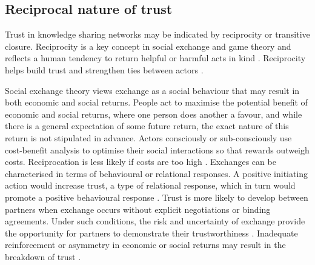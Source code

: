 \subsection{Reciprocal nature of trust}

Trust in knowledge sharing networks may be indicated by reciprocity or transitive closure. Reciprocity is a key concept in social exchange and game theory and reflects a human tendency to return helpful or harmful acts in kind \citep{nowak2005evolution}. Reciprocity helps build trust and strengthen ties between actors \citep{blau1964exchange,axelrod1984evolution}. \medskip 

Social exchange theory views exchange as a social behaviour that may result in both economic and social returns. People act to maximise the potential benefit of economic and social returns, where one person does another a favour, and while there is a general expectation of some future return, the exact nature of this return is not stipulated in advance. Actors consciously or sub-consciously use cost-benefit analysis to optimise their social interactions so that rewards outweigh costs. Reciprocation is less likely if costs are too high \citep{homans1961social,blau1964exchange}. Exchanges can be characterised in terms of behavioural or relational responses. A positive initiating action would increase trust, a type of relational response, which in turn would promote a positive behavioural response \citep{cropanzano2016social}. Trust is more likely to develop between partners when exchange occurs without explicit negotiations or binding agreements. Under such conditions, the risk and uncertainty of exchange provide the opportunity for partners to demonstrate their trustworthiness  \citep{molm2000risk}. Inadequate reinforcement or asymmetry in economic or social returns may result in the breakdown of trust \citep{homans1961social}. \medskip

